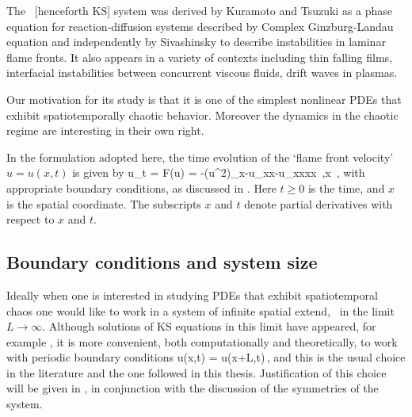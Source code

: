 
The \KS\ [henceforth KS] system was derived by
Kuramoto and Tsuzuki as a phase equation for
reaction-diffusion systems described by Complex Ginzburg-Landau
equation and independently by Sivashinsky to describe
instabilities in laminar flame fronts. It also appears
in a variety of contexts including thin falling
films, interfacial instabilities between
concurrent viscous fluids, drift waves in plasmas.

Our motivation for its study is that it is one of the simplest
nonlinear PDEs that exhibit spatiotemporally chaotic behavior.
Moreover the dynamics in the chaotic regime are interesting in
their own right.

 In the formulation
adopted here, the time evolution of the `flame front velocity'
$u=u(x,t)$ %
is given by
\beq
  u_t = F(u) = -{\textstyle{}}(u^2)_x-u_{xx}-u_{xxxx}
    \,,\qquad   x \in [-L/2,L/2]
    \,,
with appropriate boundary conditions, as discussed in .
Here $t \geq 0$ is the time, and $x$ is the spatial coordinate.
The subscripts $x$ and $t$ denote partial derivatives with respect to
$x$ and $t$.

\subsection{Boundary conditions and system size}
\label{sec:KSbc}

Ideally when one is interested in studying PDEs that exhibit spatiotemporal chaos one
would like to work in a system of infinite spatial extend, \ie\ in the limit $L\rightarrow\infty$.
Although solutions of KS equations in this limit have appeared, \cf for example , it is
more convenient, both computationally and theoretically, to work with periodic boundary conditions
\beq
  u(x,t) = u(x+L,t)\,,
 \label{eq:KSper}
\eeq
and this is the usual choice in the literature and the one followed in this thesis.
Justification of this choice will be given
in , in conjunction with the discussion of the symmetries of the system.

